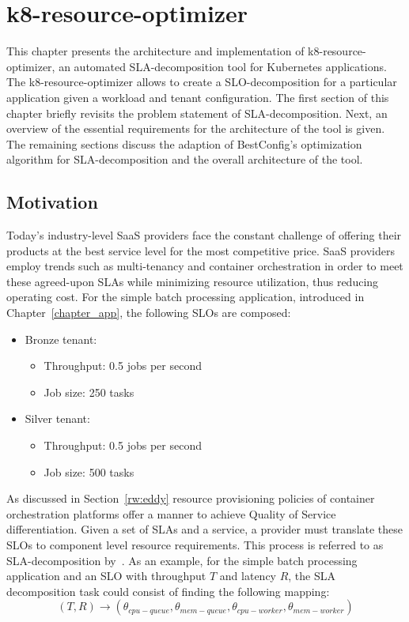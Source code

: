 \chapter{k8-resource-optimizer}
\label{ch:k8-bench}
This chapter presents the architecture and implementation of k8-resource-optimizer, an automated SLA-decomposition tool for Kubernetes applications. The k8-resource-optimizer allows to create a SLO-decomposition for a particular application given a workload and tenant configuration. The first section of this chapter briefly revisits the problem statement of SLA-decomposition. Next, an overview of the essential requirements for the architecture of the tool is given. The remaining sections discuss the adaption of BestConfig's optimization algorithm for SLA-decomposition and the overall architecture of the tool. 
\section{Motivation}
Today's industry-level SaaS providers face the constant challenge of offering their products at the best service level for the most competitive price.  SaaS providers employ trends such as multi-tenancy and container orchestration in order to meet these agreed-upon SLAs while minimizing resource utilization, thus reducing operating cost. 
For the simple batch processing application, introduced in Chapter~\ref{chapter_app}, the following SLOs are composed:
\begin{itemize}
    \item Bronze tenant:
        \begin{itemize}
            \item Throughput: 0.5 jobs per second
            \item Job size: 250 tasks
        \end{itemize}
    \item Silver tenant:
                \begin{itemize}
                    \item Throughput:  0.5 jobs per second
                    \item Job size: 500 tasks
             \end{itemize}
\end{itemize}

\noindent As discussed in Section~\ref{rw:eddy} resource provisioning policies of container orchestration platforms offer a manner to achieve Quality of Service differentiation. Given a set of SLAs and a service, a provider must translate these SLOs to component level resource requirements. This process is  referred to as SLA-decomposition by~\cite{chen2007sla}. As an example, for the simple batch processing application and an SLO with throughput $T$ and latency $R$, the SLA decomposition task could consist of finding the following mapping:
\begin{equation}
(T,R) \rightarrow (\theta_{cpu-queue},\theta_{mem-queue},\theta_{cpu-worker},\theta_{mem-worker} )
\end{equation}

